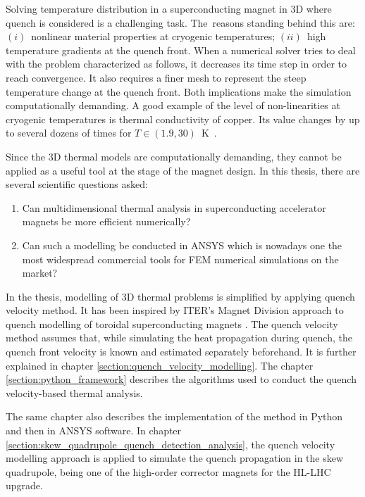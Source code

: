 
Solving temperature distribution in a superconducting magnet in 3D where quench is considered is a challenging task. The~reasons standing behind this are: $(i)$~nonlinear material properties at cryogenic temperatures; $(ii)$~high temperature gradients at the quench front. When a numerical solver tries to deal with the problem characterized as follows, it decreases its time step in order to reach convergence. It also requires a finer mesh to represent the steep temperature change at the quench front. Both implications make the simulation computationally demanding. A good example of the level of non-linearities at cryogenic temperatures is thermal conductivity of copper. Its value changes by up to several dozens of times for $T \in (1.9, 30)$~K~\cite{paudel_thesis}.

Since the 3D thermal models are computationally demanding, they cannot be applied as a useful tool at the stage of the magnet design. In this thesis, there are several scientific questions asked:
\begin{enumerate}
\item Can multidimensional thermal analysis in superconducting accelerator magnets be more efficient numerically?
\item  Can such a modelling be conducted in ANSYS which is nowadays one the most widespread commercial tools for FEM numerical simulations on the market?
\end{enumerate}

In the thesis, modelling of 3D thermal problems is simplified by applying quench velocity method. It has been inspired by ITER's Magnet Division approach to quench modelling of toroidal superconducting magnets \cite{iter_presentation_qualified_analysis, iter_fault_case_study}. The quench velocity method assumes that, while simulating the heat propagation during quench, the quench front velocity is known and estimated separately beforehand. It is further explained in chapter \ref{section:quench_velocity_modelling}. The chapter \ref{section:python_framework} describes the algorithms used to conduct the quench velocity-based thermal analysis. 

The same chapter also describes the implementation of the method in Python and then in ANSYS software. In chapter \ref{section:skew_quadrupole_quench_detection_analysis}, the quench velocity modelling approach is applied to simulate the quench propagation in the skew quadrupole, being one of the high-order corrector magnets for the HL-LHC upgrade.